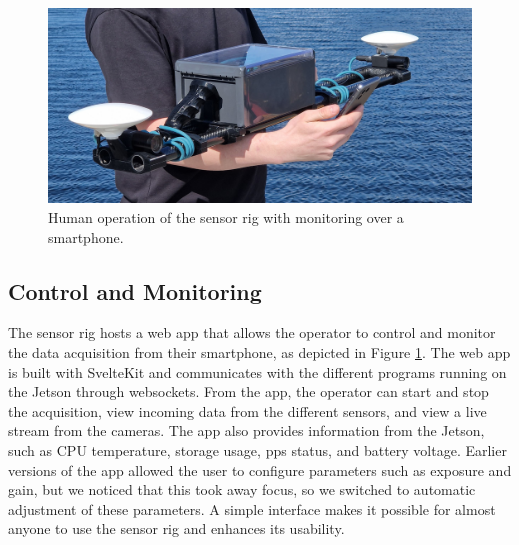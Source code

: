 \begin{figure}[H]
    \centering
    \includegraphics[trim={0 1cm 0 1cm},clip,width=\textwidth]{figures/operation.jpg}
    \caption{Human operation of the sensor rig with monitoring over a smartphone. \label{fig:operation}}
\end{figure}

\subsection{Control and Monitoring}
The sensor rig hosts a web app that allows the operator to control and monitor the data acquisition from their smartphone, as depicted in Figure \ref{fig:operation}.
The web app is built with SvelteKit and communicates with the different programs running on the Jetson through websockets.
From the app, the operator can start and stop the acquisition, view incoming data from the different sensors, and view a live stream from the cameras.
The app also provides information from the Jetson, such as CPU temperature, storage usage, \gls{pps} status, and battery voltage.
Earlier versions of the app allowed the user to configure parameters such as exposure and gain, but we noticed that this took away focus, so we switched to automatic adjustment of these parameters.
A simple interface makes it possible for almost anyone to use the sensor rig and enhances its usability.


